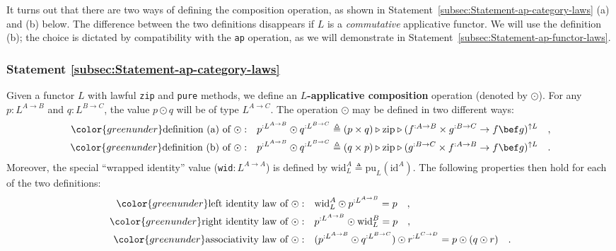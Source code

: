 It turns out that there are two ways of defining the composition operation,
as shown in Statement~\ref{subsec:Statement-ap-category-laws} (a)
and (b) below. The difference between the two definitions disappears
if $L$ is a \emph{commutative} applicative functor. We will use the
definition (b); the choice is dictated by compatibility with the \lstinline!ap!
operation, as we will demonstrate in Statement~\ref{subsec:Statement-ap-functor-laws}.

\subsubsection{Statement \label{subsec:Statement-ap-category-laws}\ref{subsec:Statement-ap-category-laws}}

Given a functor $L$ with lawful \lstinline!zip! and \lstinline!pure!
methods, we define an \textbf{$L$-applicative
composition} operation (denoted by $\odot$). For any $p:L^{A\rightarrow B}$
and $q:L^{B\rightarrow C}$, the value $p\odot q$ will be of type
$L^{A\rightarrow C}$. The operation $\odot$ may be defined in two
different ways:
\begin{align*}
{\color{greenunder}\text{definition (a) of }\odot:}\quad & p^{:L^{A\rightarrow B}}\odot q^{:L^{B\rightarrow C}}\triangleq(p\times q)\triangleright\text{zip}\triangleright(f^{:A\rightarrow B}\times g^{:B\rightarrow C}\rightarrow f\bef g)^{\uparrow L}\quad,\\
{\color{greenunder}\text{definition (b) of }\odot:}\quad & p^{:L^{A\rightarrow B}}\odot q^{:L^{B\rightarrow C}}\triangleq(q\times p)\triangleright\text{zip}\triangleright(g^{:B\rightarrow C}\times f^{:A\rightarrow B}\rightarrow f\bef g)^{\uparrow L}\quad.
\end{align*}
Moreover, the special \textsf{``}wrapped identity\textsf{''} value (\lstinline!wid!$:L^{A\rightarrow A}$)
is defined by $\text{wid}_{L}^{A}\triangleq\text{pu}_{L}(\text{id}^{A})$.
The following properties then hold for each of the two definitions:
\begin{align*}
{\color{greenunder}\text{left identity law of }\odot:}\quad & \text{wid}_{L}^{A}\odot p^{:L^{A\rightarrow B}}=p\quad,\\
{\color{greenunder}\text{right identity law of }\odot:}\quad & p^{:L^{A\rightarrow B}}\odot\text{wid}_{L}^{B}=p\quad,\\
{\color{greenunder}\text{associativity law of }\odot:}\quad & (p^{:L^{A\rightarrow B}}\odot q^{:L^{B\rightarrow C}})\odot r^{:L^{C\rightarrow D}}=p\odot(q\odot r)\quad.
\end{align*}


